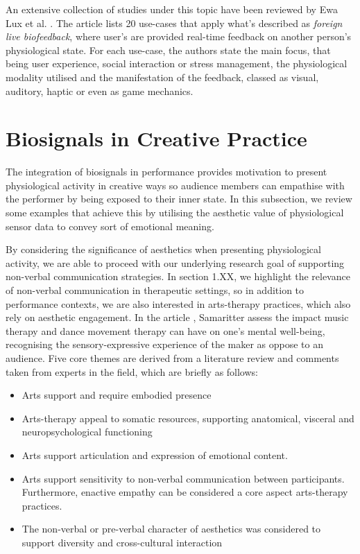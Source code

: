 An extensive collection of studies under this topic have been reviewed by Ewa Lux et al. \cite{lux_live_2018}. The article lists 20 use-cases that apply what's described as \textit{foreign live biofeedback}, where user's are provided real-time feedback on another person's physiological state. For each use-case, the authors state the main focus, that being user experience, social interaction or stress management, the physiological modality utilised and the manifestation of the feedback, classed as visual, auditory, haptic or even as game mechanics.  

\section{Biosignals in Creative Practice}
\label{lit_review:biosignals_creativity}

The integration of biosignals in performance provides motivation to present physiological activity in creative ways so audience members can empathise with the performer by being exposed to their inner state. In this subsection, we review some examples that achieve this by utilising the aesthetic value of physiological sensor data to convey sort of emotional meaning. 

By considering the significance of aesthetics when presenting physiological activity, we are able to proceed with our underlying research goal of supporting non-verbal communication strategies. In section 1.XX, we highlight the relevance of non-verbal communication in therapeutic settings, so in addition to performance contexts, we are also interested in arts-therapy practices, which also rely on aesthetic engagement. In the article \cite{samaritter_aesthetic_2018}, Samaritter assess the impact music therapy and dance movement therapy can have on one's mental well-being, recognising the sensory-expressive experience of the maker as oppose to an audience.  Five core themes are derived from a literature review and comments taken from experts in the field, which are briefly as follows:

\begin{itemize}
\item Arts support and require embodied presence
\item Arts-therapy appeal to somatic resources, supporting anatomical, visceral and neuropsychological functioning
\item Arts support articulation and expression of emotional content.
\item Arts support sensitivity to non-verbal communication between participants. Furthermore, enactive empathy can be considered a core aspect arts-therapy practices.
\item The non-verbal or pre-verbal character of aesthetics was considered to support diversity and cross-cultural interaction
\end{itemize}

